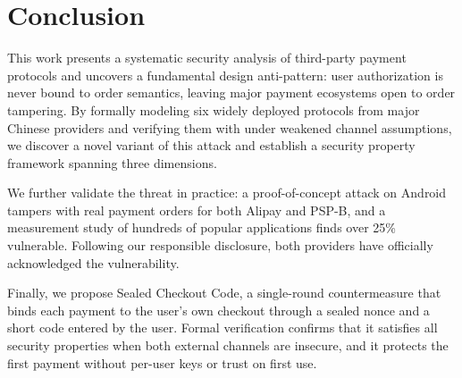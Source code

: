 \section{Conclusion}

This work presents a systematic security analysis of third-party payment protocols and uncovers a fundamental design anti-pattern: user authorization is never bound to order semantics, leaving major payment ecosystems open to order tampering.
By formally modeling six widely deployed protocols from major Chinese providers and verifying them with \Tamarin under weakened channel assumptions, we discover a novel variant of this attack and establish a security property framework spanning three dimensions.

We further validate the threat in practice: a proof-of-concept attack on Android tampers with real payment orders for both Alipay and PSP-B, and a measurement study of hundreds of popular applications finds over 25\% vulnerable.
Following our responsible disclosure, both providers have officially acknowledged the vulnerability.

Finally, we propose Sealed Checkout Code, a single-round countermeasure that binds each payment to the user's own checkout through a sealed nonce and a short code entered by the user.
Formal verification confirms that it satisfies all security properties when both external channels are insecure, and it protects the first payment without per-user keys or trust on first use.